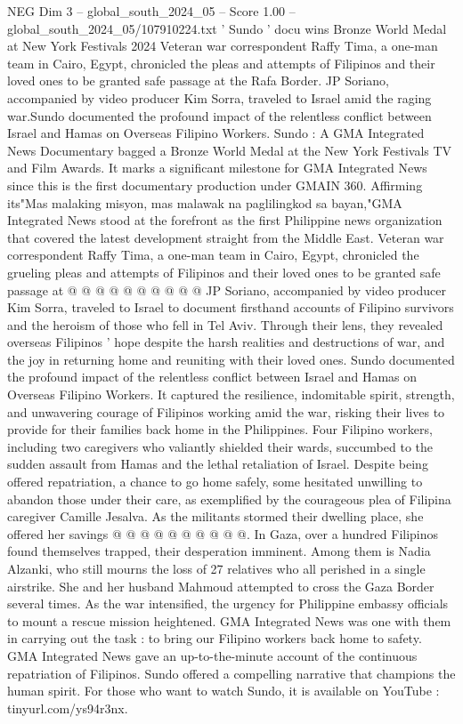 \begin{textsample}{NEG Dim 3 – global\_south\_2024\_05 – Score 1.00 – global\_south\_2024\_05/107910224.txt}  \label{ex:f3_neg_352}
' Sundo ' docu wins Bronze World Medal at New York Festivals 2024 Veteran war correspondent Raffy Tima, a one-man team in Cairo, Egypt, chronicled the pleas and attempts of Filipinos and their loved ones to be granted safe passage at the Rafa Border.
JP Soriano, accompanied by video producer Kim Sorra, traveled to Israel amid the raging war.Sundo documented the profound impact of the relentless conflict between Israel and Hamas on Overseas Filipino Workers.
Sundo : A GMA Integrated News Documentary bagged a Bronze World Medal at the New York Festivals TV and Film Awards.
It marks a significant milestone for GMA Integrated News since this is the first documentary production under GMAIN 360.
Affirming its"Mas malaking misyon, mas malawak na paglilingkod sa bayan,"GMA Integrated News stood at the forefront as the first Philippine news organization that covered the latest development straight from the Middle East.
Veteran war correspondent Raffy Tima, a one-man team in Cairo, Egypt, chronicled the grueling pleas and attempts of Filipinos and their loved ones to be granted safe passage at @ @ @ @ @ @ @ @ @ @ JP Soriano, accompanied by video producer Kim Sorra, traveled to Israel to document firsthand accounts of Filipino survivors and the heroism of those who fell in Tel Aviv.
Through their lens, they revealed overseas Filipinos ' hope despite the harsh realities and destructions of war, and the joy in returning home and reuniting with their loved ones.
Sundo documented the profound impact of the relentless conflict between Israel and Hamas on Overseas Filipino Workers.
It captured the resilience, indomitable spirit, strength, and unwavering courage of Filipinos working amid the war, risking their lives to provide for their families back home in the Philippines.
Four Filipino workers, including two caregivers who valiantly shielded their wards, succumbed to the sudden assault from Hamas and the lethal retaliation of Israel.
Despite being offered repatriation, a chance to go home safely, some hesitated unwilling to abandon those under their care, as exemplified by the courageous plea of Filipina caregiver Camille Jesalva.
As the militants stormed their dwelling place, she offered her savings @ @ @ @ @ @ @ @ @ @.
In Gaza, over a hundred Filipinos found themselves trapped, their desperation imminent.
Among them is Nadia Alzanki, who still mourns the loss of 27 relatives who all perished in a single airstrike.
She and her husband Mahmoud attempted to cross the Gaza Border several times.
As the war intensified, the urgency for Philippine embassy officials to mount a rescue mission heightened.
GMA Integrated News was one with them in carrying out the task : to bring our Filipino workers back home to safety.
GMA Integrated News gave an up-to-the-minute account of the continuous repatriation of Filipinos.
Sundo offered a compelling narrative that champions the human spirit.
For those who want to watch Sundo, it is available on YouTube : tinyurl.com/ys94r3nx.

\end{textsample}
